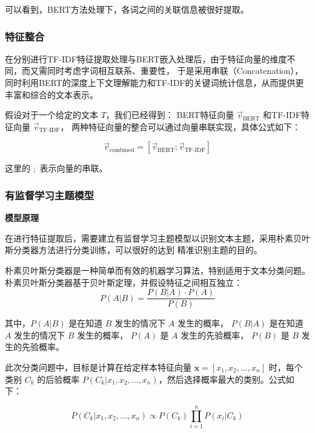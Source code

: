 \documentclass[UTF8,a4paper,15pt,titlepage,oneside]{ctexbook}
\begin{document}
可以看到，BERT方法处理下，各词之间的关联信息被很好提取。

\subsubsection{特征整合}

在分别进行TF-IDF特征提取处理与BERT嵌入处理后，由于特征向量的维度不同，而又需同时考虑字词相互联系、重要性，
于是采用串联（Concatenation），同时利用BERT的深度上下文理解能力和TF-IDF的关键词统计信息，从而提供更丰富和综合的文本表示。

假设对于一个给定的文本 \( T \)，我们已经得到：
BERT特征向量 \( \vec{v}_{\text{BERT}} \)
和TF-IDF特征向量 \( \vec{v}_{\text{TF-IDF}} \)，
两种特征向量的整合可以通过向量串联实现，具体公式如下：

\begin{equation}
\vec{v}_{\text{combined}} = \left[ \vec{v}_{\text{BERT}}; \vec{v}_{\text{TF-IDF}} \right]
\end{equation}

这里的 \( ; \) 表示向量的串联。

\subsubsection{有监督学习主题模型}

\vskip 0.2cm
\noindent
\textbf{模型原理}

在进行特征提取后，需要建立有监督学习主题模型以识别文本主题，采用朴素贝叶斯分类器方法进行分类训练，可以很好的达到
精准识别主题的目的。


朴素贝叶斯分类器是一种简单而有效的机器学习算法，特别适用于文本分类问题。
朴素贝叶斯分类器基于贝叶斯定理，并假设特征之间相互独立：
\begin{equation}
  P(A|B) = \frac{P(B|A) \cdot P(A)}{P(B)}
  \end{equation}
  
  其中，\(P(A|B)\) 是在知道 \(B\) 发生的情况下 \(A\) 发生的概率，
\(P(B|A)\) 是在知道 \(A\) 发生的情况下 \(B\) 发生的概率，
\(P(A)\) 是 \(A\) 发生的先验概率，
\(P(B)\) 是 \(B\) 发生的先验概率。


此次分类问题中，目标是计算在给定样本特征向量 \(\mathbf{x}=[x_1, x_2, \ldots, x_n]\) 时，每个类别 \(C_k\) 的后验概率 \(P(C_k|x_1, x_2, \ldots, x_n)\)，然后选择概率最大的类别。公式如下：

\begin{equation}
P(C_k|x_1, x_2, \ldots, x_n) \propto P(C_k) \prod_{i=1}^{n} P(x_i|C_k)
\end{equation}
\end{document}
